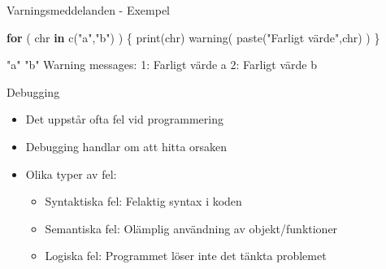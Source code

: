 \documentclass[
  11pt,
  ignorenonframetext,
]{beamer}
\newenvironment{Shaded}{\begin{snugshade}}{\end{snugshade}}
\newcommand{\ControlFlowTok}[1]{\textcolor[rgb]{0.13,0.29,0.53}{\textbf{#1}}}
\newcommand{\DecValTok}[1]{\textcolor[rgb]{0.00,0.00,0.81}{#1}}
\newcommand{\FunctionTok}[1]{\textcolor[rgb]{0.00,0.00,0.00}{#1}}
\newcommand{\NormalTok}[1]{#1}
\newcommand{\SpecialCharTok}[1]{\textcolor[rgb]{0.00,0.00,0.00}{#1}}
\newcommand{\StringTok}[1]{\textcolor[rgb]{0.31,0.60,0.02}{#1}}
\providecommand{\tightlist}{%
  \setlength{\itemsep}{0pt}\setlength{\parskip}{0pt}}
\begin{document}
\begin{frame}[fragile]{Varningsmeddelanden - Exempel}
\protect\hypertarget{varningsmeddelanden---exempel}{}
\begin{Shaded}
\begin{Highlighting}[]
\ControlFlowTok{for}\NormalTok{ ( chr }\ControlFlowTok{in} \FunctionTok{c}\NormalTok{(}\StringTok{"a"}\NormalTok{,}\StringTok{"b"}\NormalTok{) ) \{}
  \FunctionTok{print}\NormalTok{(chr)}
  \FunctionTok{warning}\NormalTok{( }\FunctionTok{paste}\NormalTok{(}\StringTok{"Farligt värde"}\NormalTok{,chr) )}
\NormalTok{\}}
\end{Highlighting}
\end{Shaded}

\pause

\begin{Shaded}
\begin{Highlighting}[]
\StringTok{"a"}
\StringTok{"b"}
\NormalTok{Warning messages}\SpecialCharTok{:}
\DecValTok{1}\SpecialCharTok{:}\NormalTok{ Farligt värde a }
\DecValTok{2}\SpecialCharTok{:}\NormalTok{ Farligt värde b }
\end{Highlighting}
\end{Shaded}
\end{frame}


\begin{frame}{Debugging}
\protect\hypertarget{debugging}{}
\begin{itemize}
\tightlist
\item
  Det uppstår ofta fel vid programmering
\item
  Debugging handlar om att hitta orsaken
\item
  Olika typer av fel:

  \begin{itemize}
  \tightlist
  \item
    Syntaktiska fel: Felaktig syntax i koden
  \item
    Semantiska fel: Olämplig användning av objekt/funktioner
  \item
    Logiska fel: Programmet löser inte det tänkta problemet
  \end{itemize}
\end{itemize}
\end{frame}

\end{document}
